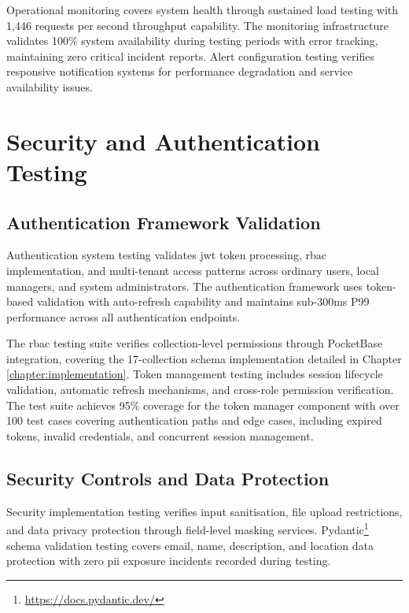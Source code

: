 Operational monitoring covers system health through sustained load testing with 1,446 requests per second throughput capability. The monitoring infrastructure validates 100\% system availability during testing periods with error tracking, maintaining zero critical incident reports. Alert configuration testing verifies responsive notification systems for performance degradation and service availability issues.


\section{Security and Authentication Testing} \label{section:security_testing}

\subsection{Authentication Framework Validation} \label{subsection:authentication_validation}

Authentication system testing validates \ac{jwt} token processing, \ac{rbac} implementation, and multi-tenant access patterns across ordinary users, local managers, and system administrators. The authentication framework uses token-based validation with auto-refresh capability and maintains sub-300ms P99 performance across all authentication endpoints.

The \ac{rbac} testing suite verifies collection-level permissions through PocketBase integration, covering the 17-collection schema implementation detailed in Chapter \ref{chapter:implementation}. Token management testing includes session lifecycle validation, automatic refresh mechanisms, and cross-role permission verification. The test suite achieves 95\% coverage for the token manager component with over 100 test cases covering authentication paths and edge cases, including expired tokens, invalid credentials, and concurrent session management.

\subsection{Security Controls and Data Protection} \label{subsection:security_controls}

Security implementation testing verifies input sanitisation, file upload restrictions, and data privacy protection through field-level masking services. Pydantic\footnote{\url{https://docs.pydantic.dev/}} schema validation testing covers email, name, description, and location data protection with zero \ac{pii} exposure incidents recorded during testing.

